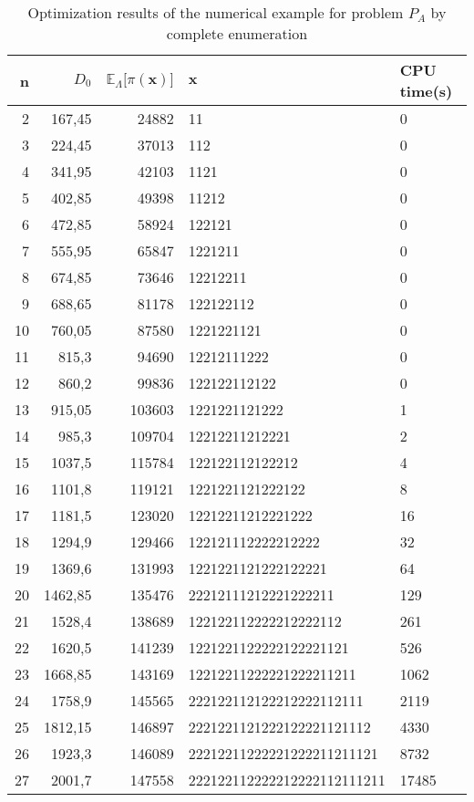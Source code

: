 \documentclass[preprint,12pt]{elsarticle}
\begin{document}
\begin{table}[htbp]
  \centering
  \caption{Optimization results of the numerical example for problem $P_{A}$ by complete enumeration}
    \begin{tabular}{rrrll}
    \toprule
    n     & $D_{0}$  &$\mathbb{E}_{\Lambda} \bigg[ \pi(\boldsymbol{x})\bigg]$  & $\boldsymbol{x}$  & CPU time(s) \\
    \midrule
    2     & 167,45 & 24882 & 11    & 0 \\
    3     & 224,45 & 37013 & 112   & 0 \\
    4     & 341,95 & 42103 & 1121  & 0 \\
    5     & 402,85 & 49398 & 11212 & 0 \\
    6     & 472,85 & 58924 & 122121 & 0 \\
    7     & 555,95 & 65847 & 1221211 & 0 \\
    8     & 674,85 & 73646 & 12212211 & 0 \\
    9     & 688,65 & 81178 & 122122112 & 0 \\
    10    & 760,05 & 87580 & 1221221121 & 0 \\
    11    & 815,3 & 94690 & 12212111222 & 0 \\
    12    & 860,2 & 99836 & 122122112122 & 0 \\
    13    & 915,05 & 103603 & 1221221121222 & 1 \\
    14    & 985,3 & 109704 & 12212211212221 & 2 \\
    15    & 1037,5 & 115784 & 122122112122212 & 4 \\
    16    & 1101,8 & 119121 & 1221221121222122 & 8 \\
    17    & 1181,5 & 123020 & 12212211212221222 & 16 \\
    18    & 1294,9 & 129466 & 122121112222212222 & 32 \\
    19    & 1369,6 & 131993 & 1221221121222122221 & 64 \\
    20    & 1462,85 & 135476 & 22212111212221222211 & 129 \\
    21    & 1528,4 & 138689 & 122122112222212222112 & 261 \\
    22    & 1620,5 & 141239 & 1221221122222122221121 & 526 \\
    23    & 1668,85 & 143169 & 12212211222221222211211 & 1062 \\
    24    & 1758,9 & 145565 & 222122112122212222112111 & 2119 \\
    25    & 1812,15 & 146897 & 2221221121222122221121112 & 4330 \\
    26    & 1923,3 & 146089 & 22212211222221222211211121 & 8732 \\
    27    & 2001,7 & 147558 & 222122112222212222112111211 & 17485 \\
    \bottomrule
    \end{tabular}%
  \label{tab:addlabel}%
\end{table}%
\end{document}
